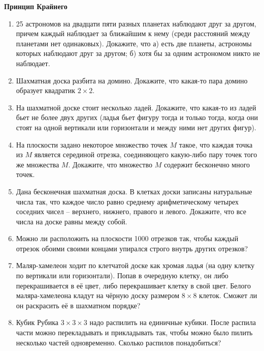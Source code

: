 \documentclass{article}
\begin{document}
\large
	
\begin{center}
	\textbf{Принцип Крайнего}
\end{center}

\begin{enumerate}[label*=\protect\fbox{\arabic{enumi}}]
	
\item 25 астрономов на двадцати пяти разных планетах наблюдают друг за другом, причем каждый наблюдает за ближайшим к нему (среди расстояний между планетами нет одинаковых). Докажите, что а) есть две планеты, астрономы которых наблюдают друг за другом; б) хотя бы за одним астрономом никто не наблюдает.

\item Шахматная доска разбита на домино. Докажите, что какая-то пара домино образует квадратик $2\times 2$.

\item На шахматной доске стоит несколько ладей. Докажите, что какая-то из ладей бьет не более двух других (ладья бьет фигуру тогда и только тогда, когда они стоят на одной вертикали или горизонтали и между ними нет других фигур).

\item На плоскости задано некоторое множество точек $M$ такое, что каждая точка из $M$ является серединой отрезка, соединяющего какую-либо пару точек того же множества $M$. Докажите, что множество $M$ содержит бесконечно много точек.

\item Дана бесконечная шахматная доска. В клетках доски записаны натуральные числа так, что каждое число равно среднему арифметическому четырех соседних чисел – верхнего, нижнего, правого и левого. Докажите, что все числа на доске равны между собой.

\item Можно ли расположить на плоскости 1000 отрезков так, чтобы каждый отрезок обоими своими концами упирался строго внутрь других отрезков?

\item Маляр-хамелеон ходит по клетчатой доске как хромая ладья (на одну клетку по вертикали или горизонтали). Попав в очередную клетку, он либо перекрашивается в её цвет, либо перекрашивает клетку в свой цвет. Белого маляра-хамелеона кладут на чёрную доску размером $8\times 8$ клеток. Сможет ли он раскрасить её в шахматном порядке?

\item Кубик Рубика $3\times 3 \times 3$ надо распилить на единичные кубики. После распила части можно перекладывать и прикладывать так, чтобы можно было пилить несколько частей одновременно. Сколько распилов понадобиться?


\end{enumerate}
\end{document}
